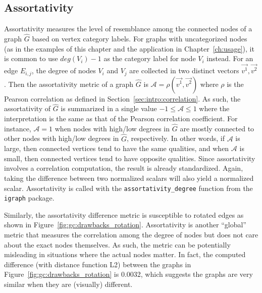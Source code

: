 \subsection{Assortativity}

Assortativity measures the level of resemblance among the connected nodes of a 
graph $\hat{G}$ based on vertex category labels. For graphs with uncategorized 
nodes (as in the examples of this chapter and the 
application in Chapter~\ref{ch:usage}), it is common to use $deg(V_i)-1$
as the category label for node $V_i$ instead. For 
an edge $E_{i,j}$, the degree of nodes $V_i$ and $V_j$ are collected in two 
distinct vectors $\overrightarrow{v^1}, \overrightarrow{v^2}$. Then the 
assortativity metric of a graph $\hat{G}$ is $\mathcal{A} = 
\rho(\overrightarrow{v^1},\overrightarrow{v^2})$ where $\rho$ is the Pearson 
correlation as defined in Section~\ref{sec:intro:correlation}. As such, 
the assortativity of $\hat{G}$ is summarized in a single value 
$-1 \leq \mathcal{A} \leq 1$ where the interpretation is the same as that of 
the Pearson correlation coefficient. For instance, $\mathcal{A}=1$ when nodes 
with high/low degrees in $\hat{G}$ are mostly connected to other nodes with 
high/low degrees in $\hat{G}$, respectively. In other words, if 
$\mathcal{A}$ is large, then connected vertices tend to have the same 
qualities, and when $\mathcal{A}$ is small, then connected vertices tend to 
have opposite qualities. Since assortativity involves a correlation 
computation, the result is already standardized. Again, taking the difference 
between two normalized scalars will also yield a normalized scalar.
Assortativity is called with the \texttt{assortativity\_degree} function from 
the \texttt{igraph} package.

Similarly, the assortativity difference metric is susceptible to rotated edges 
as shown in Figure~\ref{fig:gc:drawbacks_rotation}. Assortativity is another 
``global'' metric that measures the correlation among the degree of nodes but 
does not care about the exact nodes themselves. As such, the metric can be 
potentially misleading in situations where the actual nodes matter. In fact, 
the computed difference (with distance function L2) between the graphs in 
Figure~\ref{fig:gc:drawbacks_rotation} is 0.0032, which suggests the graphs are 
very similar when they are (visually) different.







